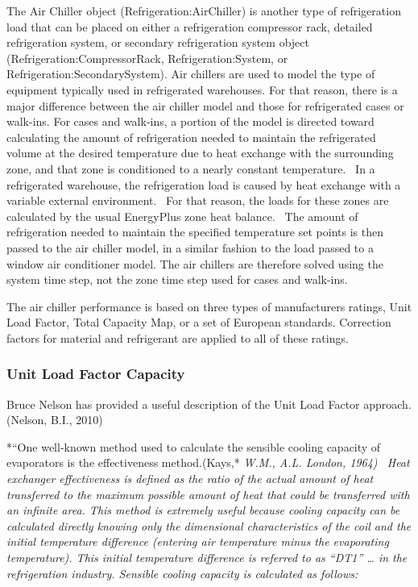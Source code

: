 The Air Chiller object (Refrigeration:AirChiller) is another type of refrigeration load that can be placed on either a refrigeration compressor rack, detailed refrigeration system, or secondary refrigeration system object (Refrigeration:CompressorRack, Refrigeration:System, or Refrigeration:SecondarySystem). Air chillers are used to model the type of equipment typically used in refrigerated warehouses. For that reason, there is a major difference between the air chiller model and those for refrigerated cases or walk-ins. For cases and walk-ins, a portion of the model is directed toward calculating the amount of refrigeration needed to maintain the refrigerated volume at the desired temperature due to heat exchange with the surrounding zone, and that zone is conditioned to a nearly constant temperature.~ In a refrigerated warehouse, the refrigeration load is caused by heat exchange with a variable external environment.~ For that reason, the loads for these zones are calculated by the usual EnergyPlus zone heat balance.~ The amount of refrigeration needed to maintain the specified temperature set points is then passed to the air chiller model, in a similar fashion to the load passed to a window air conditioner model. The air chillers are therefore solved using the system time step, not the zone time step used for cases and walk-ins.

The air chiller performance is based on three types of manufacturers ratings, Unit Load Factor, Total Capacity Map, or a set of European standards. Correction factors for material and refrigerant are applied to all of these ratings.

\subsubsection{Unit Load Factor Capacity}\label{unit-load-factor-capacity}

Bruce Nelson has provided a useful description of the Unit Load Factor approach.(Nelson, B.I., 2010)

*``One well-known method used to calculate the sensible cooling capacity of evaporators is the effectiveness method.(Kays,* \emph{W.M., A.L. London, 1964) ~Heat exchanger effectiveness is defined as the ratio of the actual amount of heat transferred to the maximum possible amount of heat that could be transferred with an infinite area. This method is extremely useful because cooling capacity can be calculated directly knowing only the dimensional characteristics of the coil and the initial temperature difference (entering air temperature minus the evaporating temperature). This initial temperature difference is referred to as ``DT1'' \ldots{} in the refrigeration industry. Sensible cooling capacity is calculated as follows:}

